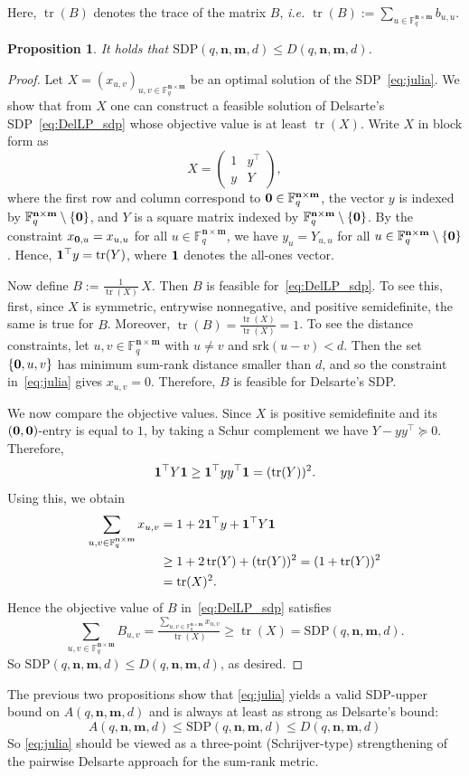 \documentclass[a4paper]{article}
\newtheorem{proposition}[formula]{Proposition}
\newcommand{\F}{\mathbb{F}}
\newcommand{\bfn}{\mathbf {n}}
\newcommand{\bfm}{\mathbf {m}}
\newcommand{\spac}{\F^{\bfn\times\bfm}_q}
\newcommand{\srk}{\mathrm{srk}}
\newcommand{\Del}{D(q,\bfn,\bfm,d)}
\DeclareMathOperator{\tr}{tr}
\begin{document}
Here, $\tr(B)$ denotes the trace of the matrix $B$, \emph{i.e.} $\tr(B):=\sum_{u\in\spac}b_{u,u}$.


\begin{proposition}\label{prop:comparisonwithdelsarte}
It holds that $\mathrm{SDP}(q,\bfn,\bfm,d)\leq \Del$.
\end{proposition}

\begin{proof}
Let $X=(x_{u,v})_{u,v\in\spac}$ be an optimal solution of the SDP~\eqref{eq:julia}. We show that from $X$ one can construct a feasible solution of Delsarte's SDP~\eqref{eq:DelLP_sdp} whose objective value is at least $\tr(X)$. Write $X$ in block form as
\[
X=
\begin{pmatrix}
1 & y^\top\\
y & Y
\end{pmatrix},
\]
where the first row and column correspond to ${\bf 0}\in\spac$, the vector $y$ is indexed by $\spac\setminus\{{\bf 0}\}$, and $Y$ is a square matrix indexed by $\spac\setminus\{{\bf 0}\}$. By the constraint $x_{{\bf 0},u}=x_{u,u}$ for all $u\in\spac$, we have $y_u=Y_{u,u}$ for all $u\in\spac\setminus\{{\bf 0}\}$. Hence, ${\bf 1}^\top y=\tr(Y)$, where ${\bf 1}$ denotes the all-ones vector.

Now define $B:=\frac{1}{\tr(X)}\,X$. Then $B$ is feasible for~\eqref{eq:DelLP_sdp}. To see this, first, since $X$ is symmetric, entrywise nonnegative, and positive semidefinite, the same is true for $B$. Moreover, $\tr(B)=\frac{\tr(X)}{\tr(X)}=1$. To see the distance constraints, let $u,v\in\spac$ with $u\neq v$ and $\srk(u-v)<d$. Then the set $\{{\bf 0},u,v\}$ has minimum sum-rank distance smaller than $d$, and so the constraint in~\eqref{eq:julia} gives $x_{u,v}=0$. Therefore, $B$ is feasible for Delsarte's SDP.

We now compare the objective values. Since $X$ is positive semidefinite and its $( {\bf 0},{\bf 0})$-entry is equal to $1$, by taking a Schur complement we have $Y-yy^\top \succeq 0$. Therefore,
\[
{\bf 1}^\top Y{\bf 1}\geq {\bf 1}^\top yy^\top {\bf 1}=(\tr(Y))^2.
\]
Using this, we obtain
\begin{align*}
\sum_{u,v\in\spac} x_{u,v}
&=
1+2{\bf 1}^\top y+{\bf 1}^\top Y{\bf 1}\\
&\geq 1+2\tr(Y)+(\tr(Y))^2=(1+\tr(Y))^2\\&=\tr(X)^2.
\end{align*}
Hence the objective value of $B$ in~\eqref{eq:DelLP_sdp} satisfies $$\sum_{u,v\in\spac} B_{u,v}= \tfrac{\sum_{u,v\in\spac} x_{u,v}}{\tr(X)}
\geq \tr(X)=\mathrm{SDP}(q,\bfn,\bfm,d).$$ 
So $\mathrm{SDP}(q,\bfn,\bfm,d)\leq \Del$, as desired.
\end{proof}
The previous two propositions show that \eqref{eq:julia} yields a valid SDP-upper bound on $A(q,\bfn,\bfm,d)$ and is always at least as strong as Delsarte’s bound:
$$
A(q,\bfn,\bfm,d) \leq \mathrm{SDP}(q,\bfn,\bfm,d)\leq \Del
$$
So \eqref{eq:julia} should be viewed as a three-point (Schrijver-type) strengthening of the pairwise Delsarte approach for the sum-rank metric.
\end{document}
